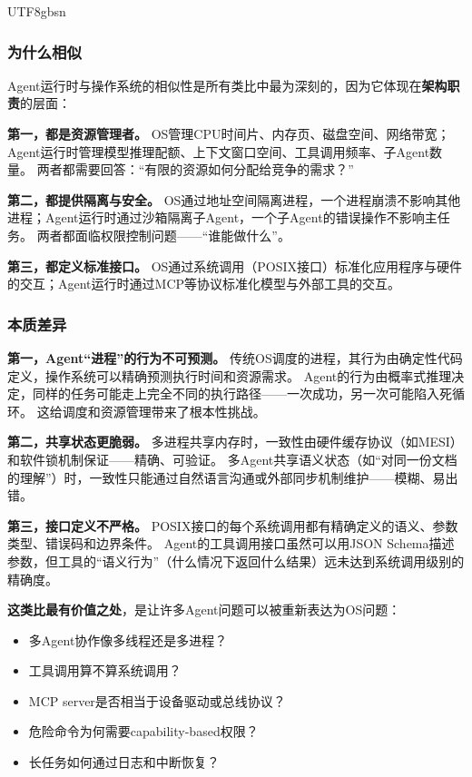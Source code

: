 \documentclass[11pt,a4paper]{article}
\begin{document}
\begin{CJK*}{UTF8}{gbsn}
\subsubsection{为什么相似}

Agent运行时与操作系统的相似性是所有类比中最为深刻的，因为它体现在\textbf{架构职责}的层面：

\textbf{第一，都是资源管理者。}
OS管理CPU时间片、内存页、磁盘空间、网络带宽；Agent运行时管理模型推理配额、上下文窗口空间、工具调用频率、子Agent数量。
两者都需要回答：``有限的资源如何分配给竞争的需求？''

\textbf{第二，都提供隔离与安全。}
OS通过地址空间隔离进程，一个进程崩溃不影响其他进程\cite{ostep_2023}；Agent运行时通过沙箱隔离子Agent，一个子Agent的错误操作不影响主任务\cite{openai_codex_sandbox_2026,anthropic_claudecode_sandbox_2026}。
两者都面临权限控制问题——``谁能做什么''。

\textbf{第三，都定义标准接口。}
OS通过系统调用（POSIX接口）标准化应用程序与硬件的交互；Agent运行时通过MCP等协议标准化模型与外部工具的交互\cite{mcp_intro_2026}。

\subsubsection{本质差异}

\textbf{第一，Agent``进程''的行为不可预测。}
传统OS调度的进程，其行为由确定性代码定义，操作系统可以精确预测执行时间和资源需求。
Agent的行为由概率式推理决定，同样的任务可能走上完全不同的执行路径——一次成功，另一次可能陷入死循环。
这给调度和资源管理带来了根本性挑战。

\textbf{第二，共享状态更脆弱。}
多进程共享内存时，一致性由硬件缓存协议（如MESI）和软件锁机制保证——精确、可验证。
多Agent共享语义状态（如``对同一份文档的理解''）时，一致性只能通过自然语言沟通或外部同步机制维护——模糊、易出错。

\textbf{第三，接口定义不严格。}
POSIX接口的每个系统调用都有精确定义的语义、参数类型、错误码和边界条件。
Agent的工具调用接口虽然可以用JSON Schema描述参数，但工具的``语义行为''（什么情况下返回什么结果）远未达到系统调用级别的精确度。

\textbf{这类比最有价值之处}，是让许多Agent问题可以被重新表达为OS问题：
\begin{itemize}[nosep]
\item 多Agent协作像多线程还是多进程？\cite{wu2023autogen}
\item 工具调用算不算系统调用？
\item MCP server是否相当于设备驱动或总线协议？\cite{mcp_intro_2026}
\item 危险命令为何需要capability-based权限？\cite{debenedetti2025camel}
\item 长任务如何通过日志和中断恢复？\cite{openai_codex_approvals_2026}
\end{itemize}


\end{CJK*}
\end{document}
